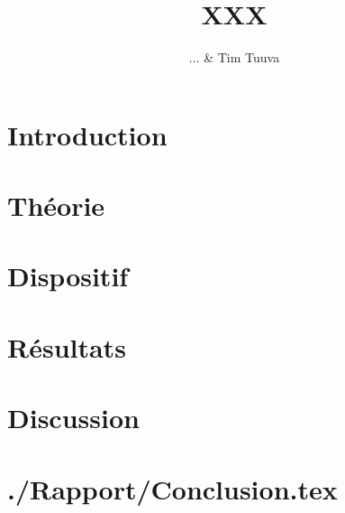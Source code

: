 \documentclass[a4paper,12pt,oneside]{article}
\begin{document}
\title{XXX}%
\author{ ... \& Tim Tuuva}

\maketitle
\tableofcontents
\baselineskip=16pt
\parindent=15pt
\parskip=5pt

\begin{abstract}

\end{abstract}

\section{Introduction}


\section{Théorie}


\section{Dispositif}



\section{Résultats}


\section{Discussion}


\section{./Rapport/Conclusion.tex}



\cite{article}
\cite{book}

\medskip
 


\end{document}
